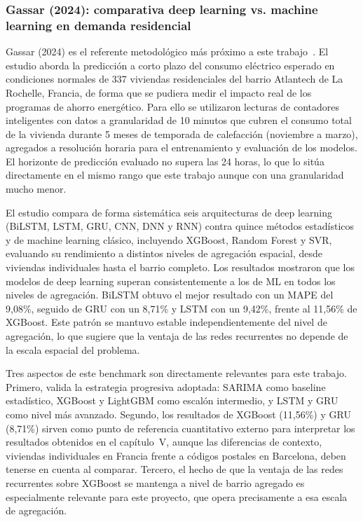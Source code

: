 \documentclass[12pt, a4paper]{article}
\begin{document}
\subsubsection{Gassar (2024): comparativa deep learning vs. machine learning en demanda residencial}

Gassar (2024) es el referente metodológico más próximo a este trabajo~\cite{gassar2024}. El estudio aborda la predicción a corto plazo del consumo eléctrico esperado en condiciones normales de 337 viviendas residenciales del barrio Atlantech de La Rochelle, Francia, de forma que se pudiera medir el impacto real de los programas de ahorro energético. Para ello se utilizaron lecturas de contadores inteligentes con datos a granularidad de 10 minutos que cubren el consumo total de la vivienda durante 5 meses de temporada de calefacción (noviembre a marzo), agregados a resolución horaria para el entrenamiento y evaluación de los modelos. El horizonte de predicción evaluado no supera las 24 horas, lo que lo sitúa directamente en el mismo rango que este trabajo aunque con una granularidad mucho menor.

El estudio compara de forma sistemática seis arquitecturas de deep learning (BiLSTM, LSTM, GRU, CNN, DNN y RNN) contra quince métodos estadísticos y de machine learning clásico, incluyendo XGBoost, Random Forest y SVR, evaluando su rendimiento a distintos niveles de agregación espacial, desde viviendas individuales hasta el barrio completo. Los resultados mostraron que los modelos de deep learning superan consistentemente a los de ML en todos los niveles de agregación. BiLSTM obtuvo el mejor resultado con un MAPE del 9,08\%, seguido de GRU con un 8,71\% y LSTM con un 9,42\%, frente al 11,56\% de XGBoost. Este patrón se mantuvo estable independientemente del nivel de agregación, lo que sugiere que la ventaja de las redes recurrentes no depende de la escala espacial del problema.

Tres aspectos de este benchmark son directamente relevantes para este trabajo. Primero, valida la estrategia progresiva adoptada: SARIMA como baseline estadístico, XGBoost y LightGBM como escalón intermedio, y LSTM y GRU como nivel más avanzado. Segundo, los resultados de XGBoost (11,56\%) y GRU (8,71\%) sirven como punto de referencia cuantitativo externo para interpretar los resultados obtenidos en el capítulo~V, aunque las diferencias de contexto, viviendas individuales en Francia frente a códigos postales en Barcelona, deben tenerse en cuenta al comparar. Tercero, el hecho de que la ventaja de las redes recurrentes sobre XGBoost se mantenga a nivel de barrio agregado es especialmente relevante para este proyecto, que opera precisamente a esa escala de agregación.
\end{document}

